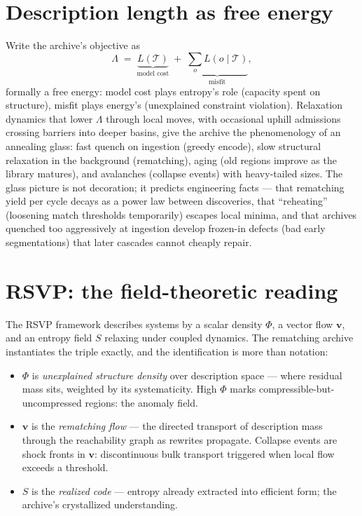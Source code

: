 \documentclass[11pt,oneside]{book}
\theoremstyle{remark}
\newcommand{\Tem}{\mathcal{T}}
\newcommand{\Phiv}{\Phi}
\newcommand{\vv}{\mathbf{v}}
\newcommand{\Sv}{S}
\begin{document}
\section{Description length as free energy}

Write the archive's objective as
\[
\Lambda \;=\; \underbrace{L(\Tem)}_{\text{model cost}}
\;+\; \underbrace{\textstyle\sum_o L(o \mid \Tem)}_{\text{misfit}} ,
\]
formally a free energy: model cost plays entropy's role (capacity spent
on structure), misfit plays energy's (unexplained constraint violation).
Relaxation dynamics that lower $\Lambda$ through local moves, with
occasional uphill admissions crossing barriers into deeper basins, give
the archive the phenomenology of an annealing glass: fast quench on
ingestion (greedy encode), slow structural relaxation in the background
(rematching), aging (old regions improve as the library matures), and
avalanches (collapse events) with heavy-tailed sizes. The glass picture
is not decoration; it predicts engineering facts --- that rematching
yield per cycle decays as a power law between discoveries, that
``reheating'' (loosening match thresholds temporarily) escapes local
minima, and that archives quenched too aggressively at ingestion develop
frozen-in defects (bad early segmentations) that later cascades cannot
cheaply repair.

\section{RSVP: the field-theoretic reading}

The RSVP framework describes systems by a scalar density $\Phiv$, a
vector flow $\vv$, and an entropy field $\Sv$ relaxing under coupled
dynamics. The rematching archive instantiates the triple exactly, and
the identification is more than notation:

\begin{itemize}[leftmargin=2em]
\item $\Phiv$ is \emph{unexplained structure density} over description
space --- where residual mass sits, weighted by its systematicity. High
$\Phiv$ marks compressible-but-uncompressed regions: the anomaly field.
\item $\vv$ is the \emph{rematching flow} --- the directed transport of
description mass through the reachability graph as rewrites propagate.
Collapse events are shock fronts in $\vv$: discontinuous bulk transport
triggered when local flow exceeds a threshold.
\item $\Sv$ is the \emph{realized code} --- entropy already extracted
into efficient form; the archive's crystallized understanding.
\end{itemize}
\end{document}
